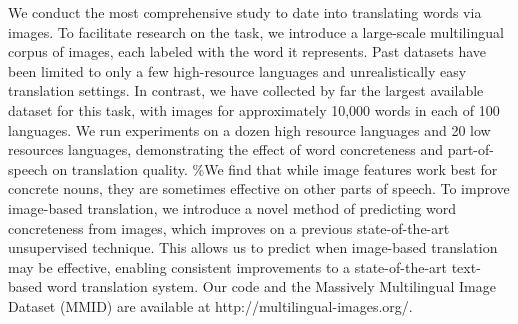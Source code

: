 We conduct the most comprehensive study to date into translating words via images. To facilitate research on the task, we introduce a large-scale multilingual corpus of images, each labeled with the word it represents. Past datasets have been limited to only a few high-resource languages and unrealistically easy translation settings. In contrast, we have collected by far the largest available dataset for this task, with images for approximately 10,000 words in each of 100 languages. We run experiments on a dozen high resource languages and 20 low resources languages, demonstrating the effect of word concreteness and part-of-speech on translation quality. \%We find that while image features work best for concrete nouns, they are sometimes effective on other parts of speech. To improve image-based translation, we introduce a novel method of predicting word concreteness from images, which improves on a previous state-of-the-art unsupervised technique. This allows us to predict when image-based translation may be effective, enabling consistent improvements to a state-of-the-art text-based word translation system. Our code and the Massively Multilingual Image Dataset (MMID) are available at http://multilingual-images.org/.
